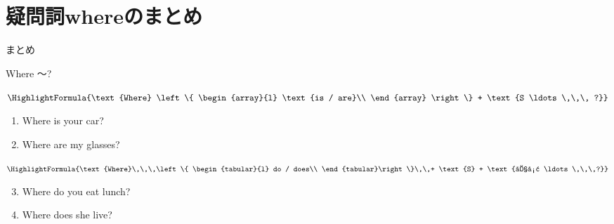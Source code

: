 \documentclass[aspectratio=169,xcolor={dvipsnames,table}]{beamer}
\begin{document}
\section{疑問詞whereのまとめ}
\begin{frame}[plain]{まとめ}
 \begin{block}{Where ～?\hspace{10pt}}
\begin{description}[　　　　]
 \item[be動詞]<2-> %
$\HighlightFormula{\text{Where} \left\{
\begin{array}{l}
 \text{is / are}\\
\end{array}
\right\} + \text{S \ldots\,\,\, ?}}$

\begin{enumerate}
 \item<3-> Where is your car?
 \item<4-> Where are my glasses?
\mbox{}
\end{enumerate}

 \item[一般動詞]<5-> $\HighlightFormula{\text{Where}\,\,\,\left\{ \begin{tabular}{l}
	  do / does\\
	 \end{tabular}\right\}%
\,\,+ \text{S} + \text{原形 \ldots\,\,\,?}}$

\begin{enumerate}\setcounter{enumi}{2}
       \item<6-> Where do you eat lunch?
       \item<7-> Where does she live?
      \end{enumerate}
\end{description}
  
 \end{block}

\end{frame}
\end{document}
